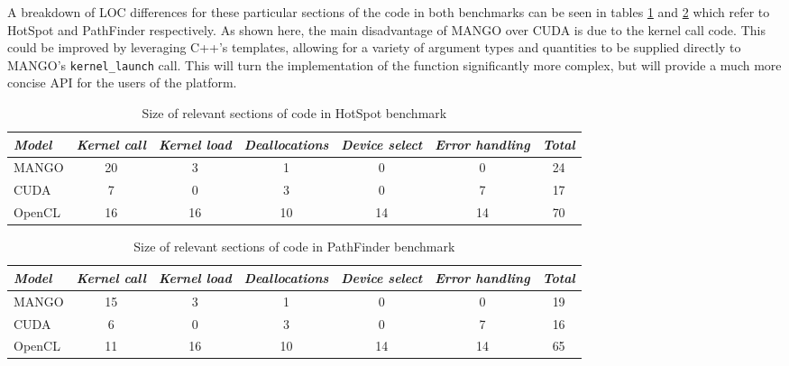 A breakdown of LOC differences for these particular sections of the code in both benchmarks can be seen in tables \ref{tab:hotspot-factors-loc} and \ref{tab:pathfinder-factors-loc} which refer to HotSpot and PathFinder respectively. As shown here, the main disadvantage of MANGO over CUDA is due to the kernel call code. This could be improved by leveraging C++'s templates, allowing for a variety of argument types and quantities to be supplied directly to MANGO's \texttt{kernel\_launch} call. This will turn the implementation of the function significantly more complex, but will provide a much more concise API for the users of the platform.

\begin{table}
    \centering
    \begin{tabular}{l|c|c|c|c|c|c}
    \textit{Model} & \textit{Kernel call} & \textit{Kernel load} & \textit{Deallocations} & \textit{Device select} & \textit{Error handling} & \textit{Total} \\ \hline
    MANGO & 20 & 3 & 1 & 0 & 0 & 24 \\
    CUDA & 7 & 0 & 3 & 0 & 7 & 17 \\
    OpenCL & 16 & 16 & 10 & 14 & 14 & 70  
    \end{tabular}
    \captionsetup{justification=centering}
    \caption{Size of relevant sections of code in HotSpot benchmark}
    \label{tab:hotspot-factors-loc}
\end{table}

\begin{table}
    \centering
    \begin{tabular}{l|c|c|c|c|c|c}
    \textit{Model} & \textit{Kernel call} & \textit{Kernel load} & \textit{Deallocations} & \textit{Device select} & \textit{Error handling} & \textit{Total} \\ \hline
    MANGO & 15 & 3 & 1 & 0 & 0 & 19 \\
    CUDA & 6 & 0 & 3 & 0 & 7 & 16 \\
    OpenCL & 11 & 16 & 10 & 14 & 14 & 65  
    \end{tabular}
    \captionsetup{justification=centering}
    \caption{Size of relevant sections of code in PathFinder benchmark}
    \label{tab:pathfinder-factors-loc}
\end{table}

